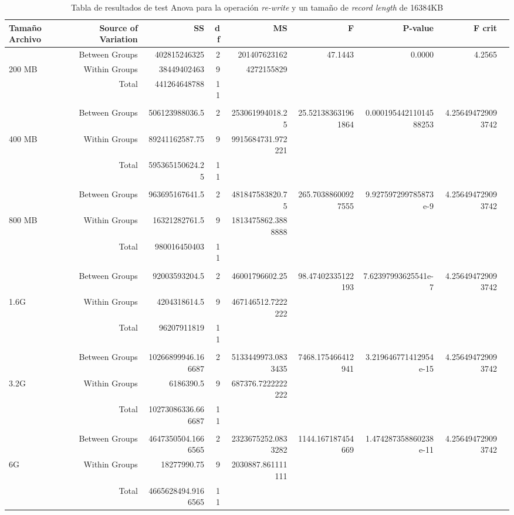 \begin{landscape}
\begin{table}[!htp]\centering
\caption{Tabla de resultados de test Anova para la operación \textit{re-write} y un tamaño de \textit{record length} de 16384KB}\label{tab: }
\scriptsize
\begin{tabular}{lrrrrrrrr}\toprule
Tamaño Archivo &Source of Variation &SS &df &MS &F &P-value &F crit \\\midrule
&Between Groups &402815246325 &2 &201407623162 &47.1443 &0.0000 &4.2565 \\
200 MB &Within Groups &38449402463 &9 &4272155829 & & & \\
&Total &441264648788 &11 & & & & \\
& & & & & & & \\
&Between Groups &506123988036.5 &2 &253061994018.25 &25.521383631961864 &0.00019544211014588253 &4.256494729093742 \\
400 MB &Within Groups &89241162587.75 &9 &9915684731.972221 & & & \\
&Total &595365150624.25 &11 & & & & \\
& & & & & & & \\
&Between Groups &963695167641.5 &2 &481847583820.75 &265.70388600927555 &9.927597299785873e-9 &4.256494729093742 \\
800 MB &Within Groups &16321282761.5 &9 &1813475862.3888888 & & & \\
&Total &980016450403 &11 & & & & \\
& & & & & & & \\
&Between Groups &92003593204.5 &2 &46001796602.25 &98.47402335122193 &7.62397993625541e-7 &4.256494729093742 \\
1.6G &Within Groups &4204318614.5 &9 &467146512.7222222 & & & \\
&Total &96207911819 &11 & & & & \\
& & & & & & & \\
&Between Groups &10266899946.166687 &2 &5133449973.0833435 &7468.175466412941 &3.219646771412954e-15 &4.256494729093742 \\
3.2G &Within Groups &6186390.5 &9 &687376.7222222222 & & & \\
&Total &10273086336.666687 &11 & & & & \\
& & & & & & & \\
&Between Groups &4647350504.1666565 &2 &2323675252.0833282 &1144.167187454669 &1.474287358860238e-11 &4.256494729093742 \\
6G &Within Groups &18277990.75 &9 &2030887.861111111 & & & \\
&Total &4665628494.9166565 &11 & & & & \\
\bottomrule
\end{tabular}
\end{table}
\end{landscape}

